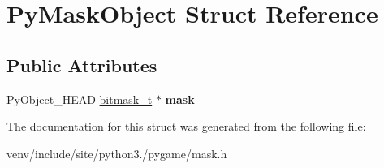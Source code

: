 \hypertarget{struct_py_mask_object}{}\section{Py\+Mask\+Object Struct Reference}
\label{struct_py_mask_object}
\subsection*{Public Attributes}
\begin{DoxyCompactItemize}
\item 
\mbox{\label{struct_py_mask_object_af7f7a0dedc948fc707c93340f5f872b5}} 
Py\+Object\+\_\+\+H\+E\+AD \hyperlink{structbitmask}{bitmask\+\_\+t} $\ast$ {\bfseries mask}
\end{DoxyCompactItemize}


The documentation for this struct was generated from the following file\+:\begin{DoxyCompactItemize}
\item 
venv/include/site/python3./pygame/mask.\+h\end{DoxyCompactItemize}
